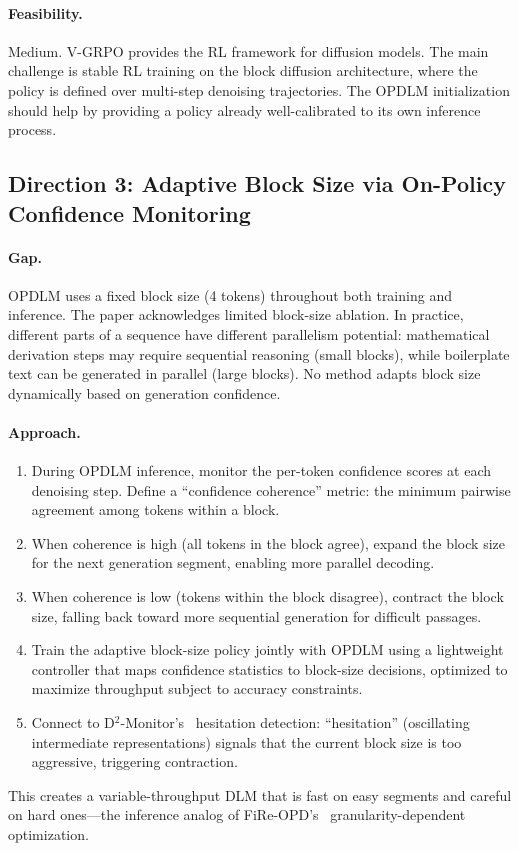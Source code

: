 \documentclass[11pt,a4paper]{article}
\begin{document}
\paragraph{Feasibility.} Medium. V-GRPO provides the RL framework for diffusion models. The main challenge is stable RL training on the block diffusion architecture, where the policy is defined over multi-step denoising trajectories. The OPDLM initialization should help by providing a policy already well-calibrated to its own inference process.

\subsection{Direction 3: Adaptive Block Size via On-Policy Confidence Monitoring}

\paragraph{Gap.} OPDLM uses a fixed block size (4 tokens) throughout both training and inference. The paper acknowledges limited block-size ablation. In practice, different parts of a sequence have different parallelism potential: mathematical derivation steps may require sequential reasoning (small blocks), while boilerplate text can be generated in parallel (large blocks). No method adapts block size dynamically based on generation confidence.

\paragraph{Approach.}
\begin{enumerate}
\item During OPDLM inference, monitor the per-token confidence scores at each denoising step. Define a ``confidence coherence'' metric: the minimum pairwise agreement among tokens within a block.
\item When coherence is high (all tokens in the block agree), expand the block size for the next generation segment, enabling more parallel decoding.
\item When coherence is low (tokens within the block disagree), contract the block size, falling back toward more sequential generation for difficult passages.
\item Train the adaptive block-size policy jointly with OPDLM using a lightweight controller that maps confidence statistics to block-size decisions, optimized to maximize throughput subject to accuracy constraints.
\item Connect to D$^2$-Monitor's~\cite{d2monitor2026} hesitation detection: ``hesitation'' (oscillating intermediate representations) signals that the current block size is too aggressive, triggering contraction.
\end{enumerate}
This creates a variable-throughput DLM that is fast on easy segments and careful on hard ones---the inference analog of FiRe-OPD's~\cite{fire2026} granularity-dependent optimization.
\end{document}
